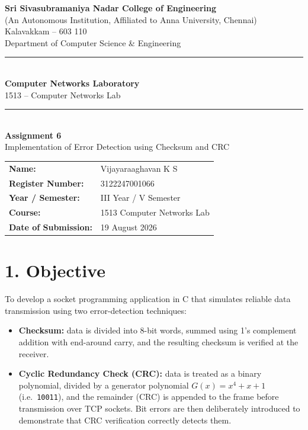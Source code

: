 \documentclass[11pt]{article}
\title{\vspace{-2cm}}
\date{}
\begin{document}
\begin{titlepage}
\centering
\vspace*{1cm}
{\large \textbf{Sri Sivasubramaniya Nadar College of Engineering}}\\
{\small (An Autonomous Institution, Affiliated to Anna University, Chennai)}\\
{\small Kalavakkam -- 603 110}\\[0.3cm]
{\small Department of Computer Science \& Engineering}\\[1.5cm]

\rule{\linewidth}{0.5mm}\\[0.4cm]
{\LARGE \textbf{Computer Networks Laboratory}}\\[0.3cm]
{\Large 1513 -- Computer Networks Lab}\\[0.4cm]
\rule{\linewidth}{0.5mm}\\[1.5cm]

{\huge \textbf{Assignment 6}}\\[0.4cm]
{\Large Implementation of Error Detection using Checksum and CRC}\\[2cm]

\begin{center}
\begin{tabular}{ll}
\textbf{Name:} & Vijayaraaghavan K S \\[0.2cm]
\textbf{Register Number:} & 3122247001066 \\[0.2cm]
\textbf{Year / Semester:} & III Year / V Semester \\[0.2cm]
\textbf{Course:} & 1513 Computer Networks Lab \\[0.2cm]
\textbf{Date of Submission:} & 19 August 2026 \\[0.2cm]
\end{tabular}
\end{center}

\vfill
\end{titlepage}

\section*{1. Objective}
To develop a socket programming application in C that simulates reliable data transmission using
two error-detection techniques:
\begin{itemize}
  \item \textbf{Checksum:} data is divided into 8-bit words, summed using 1's complement addition
        with end-around carry, and the resulting checksum is verified at the receiver.
  \item \textbf{Cyclic Redundancy Check (CRC):} data is treated as a binary polynomial, divided by
        a generator polynomial $G(x) = x^4+x+1$ (i.e.\ \texttt{10011}), and the remainder (CRC) is
        appended to the frame before transmission over TCP sockets. Bit errors are then
        deliberately introduced to demonstrate that CRC verification correctly detects them.
\end{itemize}
\end{document}
